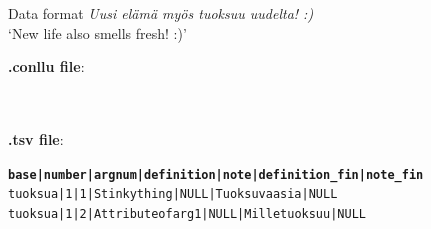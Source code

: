 \documentclass[10pt, compress]{beamer}
\begin{document}
\begin{frame}{Data format}
\emph{ Uusi elämä myös tuoksuu uudelta! :)} \\
`New life also smells fresh! :)'

\textbf{.conllu file}:

~\\
~\\
\textbf{.tsv file}:
\begin{alltt}
\textbf{base|number|argnum|definition|note|definition\_fin|note\_fin} \\
tuoksua|1|1|Stinky thing|NULL|Tuoksuva asia|NULL \\
tuoksua|1|2|Attribute of arg1|NULL|Mille tuoksuu|NULL
\end{alltt}


\end{frame}


\end{document}
